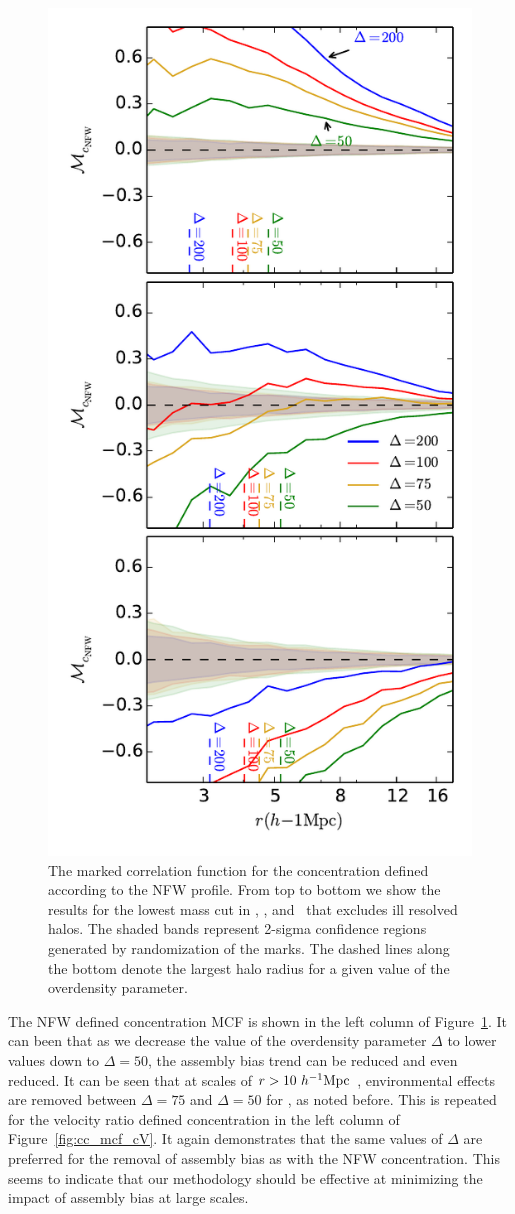 \documentclass[usenatbib,usegraphicx,letterpaper]{mn2e}
\begin{document}
\begin{figure}
	\centering
	\includegraphics[width=.4\textwidth]{all_mcf_cnfw_z00_cutcomp.pdf}
	\caption{The marked correlation function for the concentration defined according to the NFW profile. From top to bottom we show the results for the lowest mass cut in \simA, \simB, and \simC \ that excludes ill resolved halos. The shaded bands represent 2-sigma confidence regions generated by randomization of the marks. The dashed lines along the bottom denote the largest halo radius for a given value of the overdensity parameter.}
	\label{fig:cc_mcf_cnfw}
\end{figure}

The NFW defined concentration MCF is shown in the left column of Figure~\ref{fig:cc_mcf_cnfw}. It can been that as we decrease the value of the overdensity parameter $\Delta$ to lower values down to $\Delta = 50$, the assembly bias trend can be reduced and even reduced. It can be seen that at scales of $r > 10 \ h^{-1}\mathrm{Mpc}~$, environmental effects are removed between $\Delta = 75$ and $\Delta = 50$ for \simB, as noted before. This is repeated for the velocity ratio defined concentration in the left column of Figure~\ref{fig:cc_mcf_cV}. It again demonstrates that the same values of $\Delta$ are preferred for the removal of assembly bias as with the NFW concentration. This seems to indicate that our methodology should be effective at minimizing the impact of assembly bias at large scales.
\end{document}
